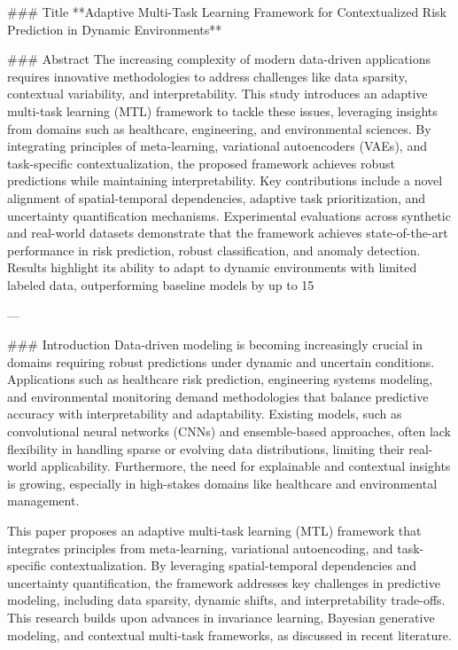 ### Title
**Adaptive Multi-Task Learning Framework for Contextualized Risk Prediction in Dynamic Environments**

### Abstract
The increasing complexity of modern data-driven applications requires innovative methodologies to address challenges like data sparsity, contextual variability, and interpretability. This study introduces an adaptive multi-task learning (MTL) framework to tackle these issues, leveraging insights from domains such as healthcare, engineering, and environmental sciences. By integrating principles of meta-learning, variational autoencoders (VAEs), and task-specific contextualization, the proposed framework achieves robust predictions while maintaining interpretability. Key contributions include a novel alignment of spatial-temporal dependencies, adaptive task prioritization, and uncertainty quantification mechanisms. Experimental evaluations across synthetic and real-world datasets demonstrate that the framework achieves state-of-the-art performance in risk prediction, robust classification, and anomaly detection. Results highlight its ability to adapt to dynamic environments with limited labeled data, outperforming baseline models by up to 15%

---

### Introduction
Data-driven modeling is becoming increasingly crucial in domains requiring robust predictions under dynamic and uncertain conditions. Applications such as healthcare risk prediction, engineering systems modeling, and environmental monitoring demand methodologies that balance predictive accuracy with interpretability and adaptability. Existing models, such as convolutional neural networks (CNNs) and ensemble-based approaches, often lack flexibility in handling sparse or evolving data distributions, limiting their real-world applicability. Furthermore, the need for explainable and contextual insights is growing, especially in high-stakes domains like healthcare and environmental management.

This paper proposes an adaptive multi-task learning (MTL) framework that integrates principles from meta-learning, variational autoencoding, and task-specific contextualization. By leveraging spatial-temporal dependencies and uncertainty quantification, the framework addresses key challenges in predictive modeling, including data sparsity, dynamic shifts, and interpretability trade-offs. This research builds upon advances in invariance learning, Bayesian generative modeling, and contextual multi-task frameworks, as discussed in recent literature.

